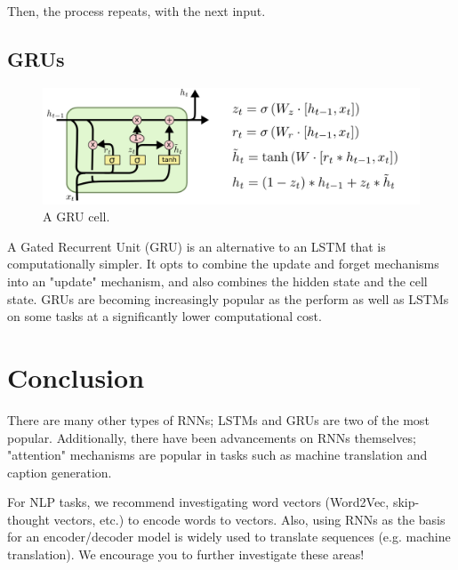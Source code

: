 \documentclass{article}
\begin{document}
    Then, the process repeats, with the next input.
    \subsection{GRUs}
        
        \begin{figure}[H]
            \centerline{\includegraphics[scale=0.4]{GRU.png}}
            \caption{A GRU cell.}
            \label{fig:gru}
        \end{figure}
        A Gated Recurrent Unit (GRU) is an alternative to an LSTM that is computationally simpler. It opts to combine the update and forget mechanisms into an "update" mechanism, and also combines the hidden state and the cell state. GRUs are becoming increasingly popular as the perform as well as LSTMs on some tasks at a significantly lower computational cost.
\section{Conclusion}
    There are many other types of RNNs; LSTMs and GRUs are two of the most popular. Additionally, there have been advancements on RNNs themselves; "attention" mechanisms are popular in tasks such as machine translation and caption generation. 
    
    For NLP tasks, we recommend investigating word vectors (Word2Vec, skip-thought vectors, etc.) to encode words to vectors. Also, using RNNs as the basis for an encoder/decoder model is widely used to translate sequences (e.g. machine translation). We encourage you to further investigate these areas!
    
\end{document}
